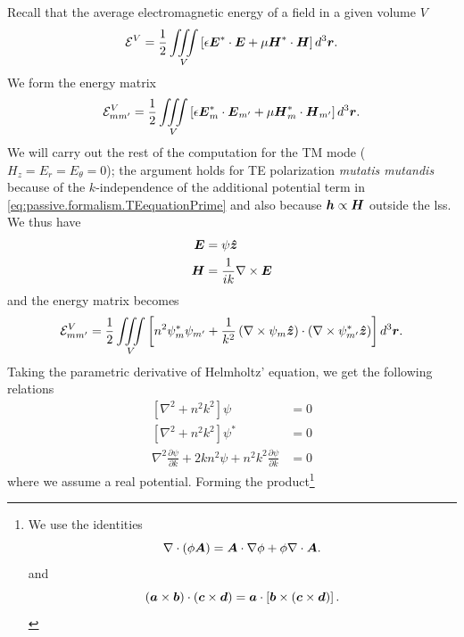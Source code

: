 Recall that the average electromagnetic energy of a field
in a given volume $V$
  \begin{equation}
   \mathcal{E}^V = \frac{1}{2}\mathop{\iiint}_V\left[\epsilon\boldsymbol{E}^*\cdot\boldsymbol{E}+\mu\boldsymbol{H}^*\cdot\boldsymbol{H}\right]d^3\boldsymbol{r}.
  \end{equation}
We form the energy matrix 
  \begin{equation}
   \mathcal{E}^V_{mm'} = \frac{1}{2}\mathop{\iiint}_V\left[\epsilon\boldsymbol{E}^*_m\cdot\boldsymbol{E}_{m'}+\mu\boldsymbol{H}^*_m\cdot\boldsymbol{H}_{m'}\right]d^3\boldsymbol{r}.
  \end{equation}
We will carry out the rest of the computation for the TM mode ($H_z=E_r=E_\theta=0$);
the argument holds for TE polarization \textit{mutatis mutandis} because of the
$k$-independence of the additional potential term in \eqref{eq:passive.formalism.TEequationPrime}
and also because $\boldsymbol{h}\propto\boldsymbol{H}$ outside the \gls{lss}. We thus have 
  \begin{align*}
    \boldsymbol{E}	&= \psi\boldsymbol{\hat{z}}	\\
    \boldsymbol{H}	&= \frac{1}{ik}\nabla\times\boldsymbol{E}
  \end{align*}
and the energy matrix becomes
\begin{align}
    \mathcal{E}^V_{mm'}	&= \frac{1}{2}\mathop{\iiint}_V\left[n^2\psi^*_{m}\psi_{m'}+\frac{1}{k^2}\left(\nabla\times\psi_{m}\boldsymbol{\hat{z}}\right)\cdot\left(\nabla\times\psi^*_{m'}\boldsymbol{\hat{z}}\right)\right]d^3\boldsymbol{r}.	\nonumber\\
  \end{align}
Taking the parametric derivative of Helmholtz' equation, we get the 
following relations
  \begin{subequations}
  \label{eq:passive.formalism.parametricHelmholtz}
  \begin{align}
   \left[\nabla^2+n^2k^2\right]\psi								&=0	\\
   \left[\nabla^2+n^2k^2\right]\psi^*								&=0	\\
   \nabla^2\frac{\partial\psi}{\partial k}+2kn^2\psi+n^2k^2\frac{\partial\psi}{\partial k}	&=0
  \end{align}
  \end{subequations}
where we assume a real potential.
Forming the product\footnote{We use the identities \cite[Appendix II]{STR1941}
  \begin{equation*}
    \nabla\cdot\left(\phi\boldsymbol{A}\right) = \boldsymbol{A}\cdot\nabla\phi+\phi\nabla\cdot\boldsymbol{A}.
  \end{equation*}
and
  \begin{equation*}
    (\boldsymbol{a}\times\boldsymbol{b})\cdot(\boldsymbol{c}\times\boldsymbol{d}) = \boldsymbol{a}\cdot\left[\boldsymbol{b}\times(\boldsymbol{c}\times\boldsymbol{d})\right].
  \end{equation*}
}
